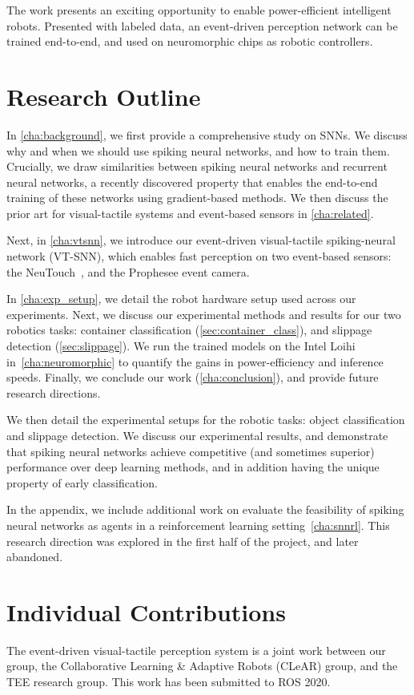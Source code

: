 \documentclass[fyp]{socreport}
\begin{document}
The work presents an exciting opportunity to enable power-efficient intelligent
robots. Presented with labeled data, an event-driven perception network can be
trained end-to-end, and used on neuromorphic chips as robotic controllers.

\section{Research Outline}

In \autoref{cha:background}, we first provide a comprehensive study on SNNs. We
discuss why and when we should use spiking neural networks, and how to train
them. Crucially, we draw similarities between spiking neural networks and
recurrent neural networks, a recently discovered property that enables the
end-to-end training of these networks using gradient-based methods. We then
discuss the prior art for visual-tactile systems and event-based sensors in
\autoref{cha:related}.

Next, in \autoref{cha:vtsnn}, we introduce our event-driven visual-tactile
spiking-neural network (VT-SNN), which enables fast perception on two
event-based sensors: the NeuTouch~\cite{aiskinLee}, and the Prophesee event
camera.

In \autoref{cha:exp_setup}, we detail the robot hardware setup used across our
experiments. Next, we discuss our experimental methods and results for our two
robotics tasks: container classification (\autoref{sec:container_class}), and
slippage detection (\autoref{sec:slippage}). We run the trained models on the
Intel Loihi in~\autoref{cha:neuromorphic} to quantify the gains in
power-efficiency and inference speeds. Finally, we conclude our work
(\autoref{cha:conclusion}), and provide future research directions.

We then detail the experimental setups for the robotic tasks: object
classification and slippage detection. We discuss our experimental results, and
demonstrate that spiking neural networks achieve competitive (and sometimes
superior) performance over deep learning methods, and in addition having the
unique property of early classification.

In the appendix, we include additional work on evaluate the feasibility of
spiking neural networks as agents in a reinforcement learning
setting~\autoref{cha:snnrl}. This research direction was explored in the
first half of the project, and later abandoned.

\section{Individual Contributions}
The event-driven visual-tactile perception system is a joint work between our
group, the Collaborative Learning \& Adaptive Robots (CLeAR) group, and the TEE
research group. This work has been submitted to ROS 2020.
\end{document}

